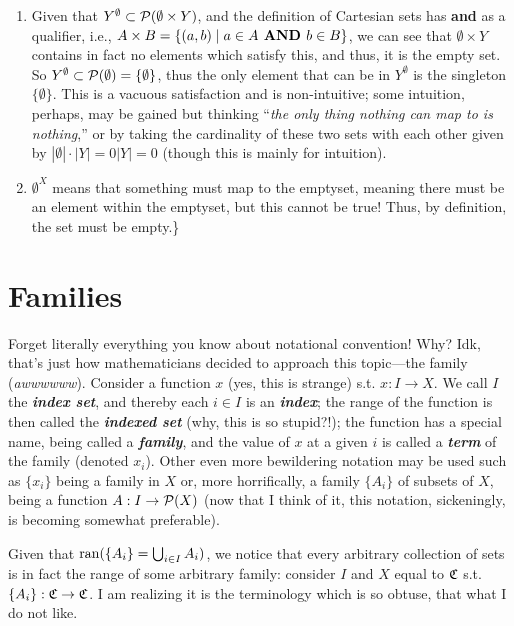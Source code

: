 \documentclass{report}
\begin{document}
\begin{solution}
\begin{enumerate}
\item Given that \(Y^{\emptyset} \subset \mathcal{P} (\emptyset \times Y)\), and the definition of Cartesian sets has \textbf{and} as a qualifier, i.e., \(A \times  B = \{(a,b) \mid a \in A \text{\textbf{ AND }} b \in  B \}\), we can see that \(\emptyset \times  Y\) contains in fact no elements which satisfy this, and thus, it is the empty set. So \(Y^{\emptyset}  \subset  \mathcal{P}(\emptyset) = \{\emptyset\}\), thus the only element that can be in \(Y^{\emptyset}\) is the singleton \(\{\emptyset\}\). This is a vacuous satisfaction and is non-intuitive; some intuition, perhaps, may be gained but thinking ``\emph{the only thing nothing can map to is nothing},'' or by taking the cardinality of these two sets with each other given by \(|\emptyset|\cdot |Y|=0|Y|=0\) (though this is mainly for intuition).
\item \(\emptyset^X\) means that something must map to the emptyset, meaning there must be an element within the emptyset, but this cannot be true! Thus, by definition, the set must be empty.\}
\end{enumerate}
\end{solution}
\section{Families}

Forget literally everything you know about notational convention! Why? Idk, that's just how mathematicians decided to approach this topic---the family (\emph{awwwwww}). Consider a function \(x\) (yes, this is strange) s.t. \(x : I \to  X\). We call \(I\) the \textbf{\emph{index set}}, and thereby each \(i \in  I\) is an \textbf{\emph{index}}; the range of the function is then called the \textbf{\emph{indexed set}} (why, this is so stupid?!); the function has a special name, being called a \textbf{\emph{family}}, and the value of \(x\) at a given \(i\) is called a \textbf{\emph{term}} of the family (denoted \(x_{i}\)). Other even more bewildering notation may be used such as \(\{x_{i}\}\) being a family in \(X\) or, more horrifically, a family \(\{A_i\}\) of subsets of \(X\), being a function \(A : I \to  \mathcal{P}(X)\) (now that I think of it, this notation, sickeningly, is becoming somewhat preferable).

Given that \(\operatorname{ran} (\{A_i\}= \bigcup_{i \in  I} A_i  )\), we notice that every arbitrary collection of sets is in fact the range of some arbitrary family: consider \(I\) and \(X\) equal to \(\mathfrak{C}\) s.t. \(\{A_i\} : \mathfrak{C} \to  \mathfrak{C}\). I am realizing it is the terminology which is so obtuse, that what I do not like.
\end{document}
